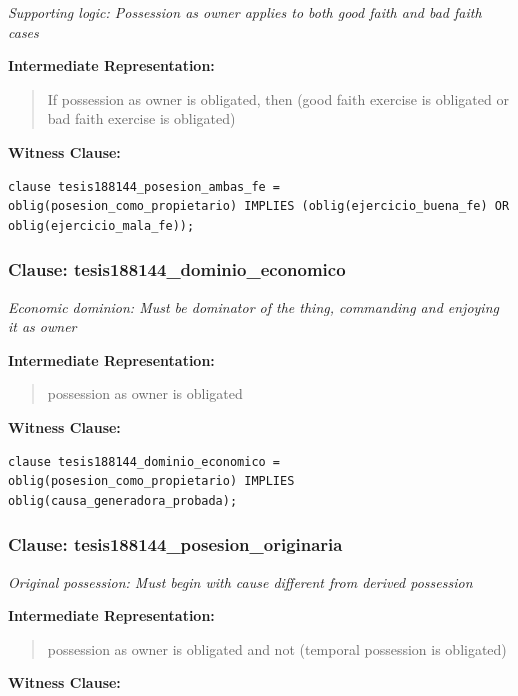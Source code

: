 \documentclass[11pt,a4paper]{article}
\begin{document}
\textit{Supporting logic: Possession as owner applies to both good faith and bad faith cases}

\textbf{Intermediate Representation:}

\begin{quote}
If possession as owner is obligated, then (good faith exercise is obligated or bad faith exercise is obligated)
\end{quote}

\textbf{Witness Clause:}

\begin{lstlisting}[style=witnessstyle, language=Witness]
clause tesis188144_posesion_ambas_fe = oblig(posesion_como_propietario) IMPLIES (oblig(ejercicio_buena_fe) OR oblig(ejercicio_mala_fe));
\end{lstlisting}

\subsubsection{Clause: tesis188144\_dominio\_economico}

\textit{Economic dominion: Must be dominator of the thing, commanding and enjoying it as owner}

\textbf{Intermediate Representation:}

\begin{quote}
possession as owner is obligated
\end{quote}

\textbf{Witness Clause:}

\begin{lstlisting}[style=witnessstyle, language=Witness]
clause tesis188144_dominio_economico = oblig(posesion_como_propietario) IMPLIES oblig(causa_generadora_probada);
\end{lstlisting}

\subsubsection{Clause: tesis188144\_posesion\_originaria}

\textit{Original possession: Must begin with cause different from derived possession}

\textbf{Intermediate Representation:}

\begin{quote}
possession as owner is obligated and not (temporal possession is obligated)
\end{quote}

\textbf{Witness Clause:}
\end{document}
